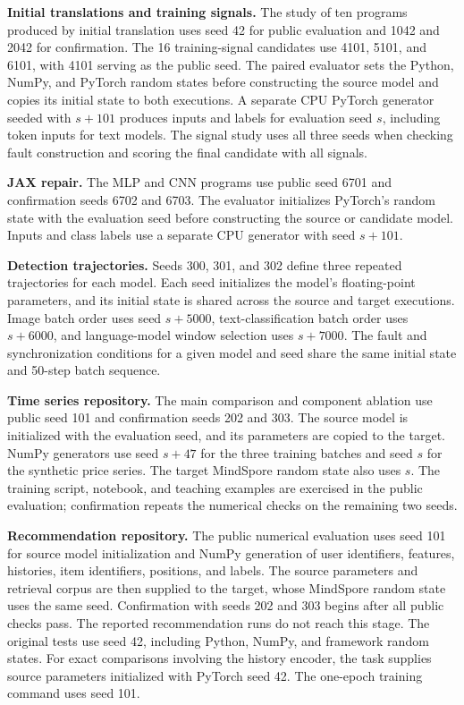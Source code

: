 \documentclass{article}
\begin{document}
\textbf{Initial translations and training signals.} The study of ten programs produced by initial translation uses seed 42 for public evaluation and 1042 and 2042 for confirmation. The 16 training-signal candidates use 4101, 5101, and 6101, with 4101 serving as the public seed. The paired evaluator sets the Python, NumPy, and PyTorch random states before constructing the source model and copies its initial state to both executions. A separate CPU PyTorch generator seeded with $s+101$ produces inputs and labels for evaluation seed $s$, including token inputs for text models. The signal study uses all three seeds when checking fault construction and scoring the final candidate with all signals.

\textbf{JAX repair.} The MLP and CNN programs use public seed 6701 and confirmation seeds 6702 and 6703. The evaluator initializes PyTorch's random state with the evaluation seed before constructing the source or candidate model. Inputs and class labels use a separate CPU generator with seed $s+101$.

\textbf{Detection trajectories.} Seeds 300, 301, and 302 define three repeated trajectories for each model. Each seed initializes the model's floating-point parameters, and its initial state is shared across the source and target executions. Image batch order uses seed $s+5000$, text-classification batch order uses $s+6000$, and language-model window selection uses $s+7000$. The fault and synchronization conditions for a given model and seed share the same initial state and 50-step batch sequence.

\textbf{Time series repository.} The main comparison and component ablation use public seed 101 and confirmation seeds 202 and 303. The source model is initialized with the evaluation seed, and its parameters are copied to the target. NumPy generators use seed $s+47$ for the three training batches and seed $s$ for the synthetic price series. The target MindSpore random state also uses $s$. The training script, notebook, and teaching examples are exercised in the public evaluation; confirmation repeats the numerical checks on the remaining two seeds.

\textbf{Recommendation repository.} The public numerical evaluation uses seed 101 for source model initialization and NumPy generation of user identifiers, features, histories, item identifiers, positions, and labels. The source parameters and retrieval corpus are then supplied to the target, whose MindSpore random state uses the same seed. Confirmation with seeds 202 and 303 begins after all public checks pass. The reported recommendation runs do not reach this stage. The original tests use seed 42, including Python, NumPy, and framework random states. For exact comparisons involving the history encoder, the task supplies source parameters initialized with PyTorch seed 42. The one-epoch training command uses seed 101.
\end{document}
